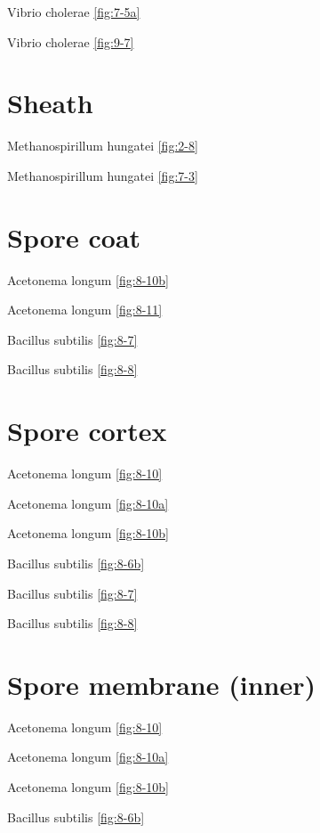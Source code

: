 \documentclass[]{tufte-book}
\begin{document}
Vibrio cholerae \ref{fig:7-5a}

Vibrio cholerae \ref{fig:9-7}

\hypertarget{sheath-1}{%
\section*{Sheath}\label{sheath-1}}

Methanospirillum hungatei \ref{fig:2-8}

Methanospirillum hungatei \ref{fig:7-3}

\hypertarget{spore-coat}{%
\section*{Spore coat}\label{spore-coat}}

Acetonema longum \ref{fig:8-10b}

Acetonema longum \ref{fig:8-11}

Bacillus subtilis \ref{fig:8-7}

Bacillus subtilis \ref{fig:8-8}

\hypertarget{spore-cortex}{%
\section*{Spore cortex}\label{spore-cortex}}

Acetonema longum \ref{fig:8-10}

Acetonema longum \ref{fig:8-10a}

Acetonema longum \ref{fig:8-10b}

Bacillus subtilis \ref{fig:8-6b}

Bacillus subtilis \ref{fig:8-7}

Bacillus subtilis \ref{fig:8-8}

\hypertarget{spore-membrane-inner}{%
\section*{Spore membrane (inner)}\label{spore-membrane-inner}}

Acetonema longum \ref{fig:8-10}

Acetonema longum \ref{fig:8-10a}

Acetonema longum \ref{fig:8-10b}

Bacillus subtilis \ref{fig:8-6b}
\end{document}
